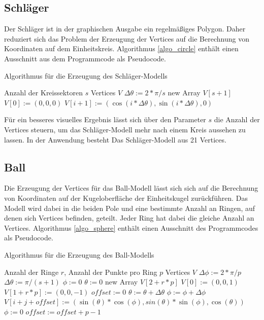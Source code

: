 \subsection{Schläger}
%
Der Schläger ist in der graphischen Ausgabe ein regelmäßiges Polygon. Daher reduziert sich das Problem der Erzeugung der Vertices auf die Berechnung von Koordinaten auf dem Einheitskreis. Algorithmus \ref{algo_circle} enthält einen Ausschnitt aus dem Programmcode als Pseudocode.

\begin{algorithm}[t]
	\centering
	\caption{Algorithmus für die Erzeugung des Schläger-Modells} \label{algo_circle}
	\begin{algorithmic}
		\REQUIRE Anzahl der Kreissektoren $s$
		\ENSURE Vertices $V$
		\STATE $\Delta\theta := 2*\pi/s$
		\STATE new Array $V[s+1]$
		\STATE $V[0] := (0,0,0)$
		\STATE $V[i+1] := (\cos(i*\Delta\theta), \sin(i*\Delta\theta), 0)$
		\ENDFOR
	\end{algorithmic}
\end{algorithm}

Für ein besseres visuelles Ergebnis lässt sich über den Parameter $s$ die Anzahl der Vertices steuern, um das Schläger-Modell mehr nach einem Kreis aussehen zu lassen. In der Anwendung besteht Das Schläger-Modell aus 21 Vertices.

\subsection{Ball}
%
Die Erzeugung der Vertices für das Ball-Modell lässt sich sich auf die Berechnung von Koordinaten auf der Kugeloberfläche der Einheitskugel zurückführen. Das Modell wird dabei in die beiden Pole und eine bestimmte Anzahl an Ringen, auf denen sich Vertices befinden, geteilt. Jeder Ring hat dabei die gleiche Anzahl an Vertices. Algorithmus \ref{algo_sphere} enthält einen Ausschnitt des Programmcodes als Pseudocode.

\begin{algorithm}[t]
	\centering
	\caption{Algorithmus für die Erzeugung des Ball-Modells} \label{algo_sphere}
	\begin{algorithmic}
		\REQUIRE Anzahl der Ringe $r$, Anzahl der Punkte pro Ring $p$
		\ENSURE Vertices $V$
		\STATE $\Delta\phi := 2*\pi/p$
		\STATE $\Delta\theta := \pi/(s + 1)$
		\STATE $\phi := 0$
		\STATE $\theta := 0$
		\STATE new Array $V[2 + r * p]$
		\STATE $V[0] := (0,0,1)$
		\STATE $V[1 + r * p] := (0,0,-1)$
		\STATE $offset := 0$
		\FOR{$i := 1$ \TO $i \leq r$}
		\STATE $\theta := \theta +\Delta\theta$
			\FOR{$j := 0$ \TO $j < p$}
			\STATE $\phi := \phi +\Delta\phi$
			\STATE $V[i + j + offset] := (\sin(\theta)*\cos(\phi), sin(\theta) * \sin(\phi), \cos(\theta))$
			\ENDFOR
			\STATE $\phi := 0$
			\STATE $offset := offset + p - 1$
		\ENDFOR
	\end{algorithmic}
\end{algorithm}

